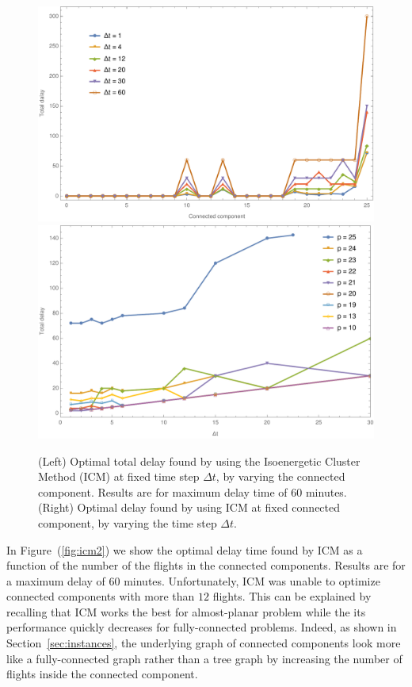 \begin{figure}
  \includegraphics[width=\columnwidth]{pics/qubo_icm/qubo_icm_3.pdf}
  \includegraphics[width=\columnwidth]{pics/qubo_icm/qubo_icm_4.pdf}
  \caption{\label{fig:icm1}(Left) Optimal total delay found by using the
  Isoenergetic Cluster Method (ICM) at fixed time step $\Delta t$, by varying
  the connected component. Results are for maximum delay time of $60$ minutes. (Right)
  Optimal delay found by using ICM at fixed connected component, by varying the time step
  $\Delta t$.}
\end{figure}

In Figure~(\ref{fig:icm2}) we show the optimal delay time found by ICM as a
function of the number of the flights in the connected components. Results are
for a maximum delay of 60 minutes. Unfortunately, ICM was unable to optimize
connected components with more than $12$ flights. This can be explained by
recalling that ICM works the best for almost-planar problem while the
its performance quickly decreases for fully-connected problems. Indeed, as shown
in Section~\ref{sec:instances}, the underlying graph of connected components
look more like a fully-connected graph rather than a tree graph by increasing
the number of flights inside the connected component.

